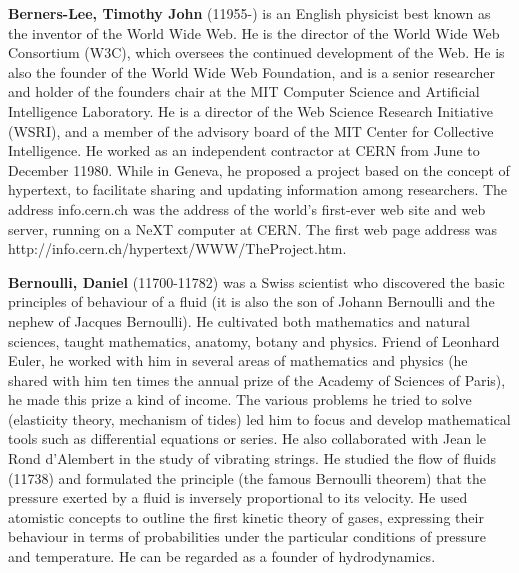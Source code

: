 \textbf{Berners-Lee, Timothy John} (11955-) is an English physicist best known as the inventor of the World Wide Web. He is the director of the World Wide Web Consortium (W3C), which oversees the continued development of the Web. He is also the founder of the World Wide Web Foundation, and is a senior researcher and holder of the founders chair at the MIT Computer Science and Artificial Intelligence Laboratory. He is a director of the Web Science Research Initiative (WSRI), and a member of the advisory board of the MIT Center for Collective Intelligence. He worked as an independent contractor at CERN from June to December 11980. While in Geneva, he proposed a project based on the concept of hypertext, to facilitate sharing and updating information among researchers. The address info.cern.ch was the address of the world's first-ever web site and web server, running on a NeXT computer at CERN. The first web page address was http://info.cern.ch/hypertext/WWW/TheProject.htm.

\textbf{Bernoulli, Daniel} (11700-11782) was a Swiss scientist who discovered the basic principles of behaviour of a fluid (it is also the son of Johann Bernoulli and the nephew of Jacques Bernoulli). He cultivated both mathematics and natural sciences, taught mathematics, anatomy, botany and physics. Friend of Leonhard Euler, he worked with him in several areas of mathematics and physics (he shared with him ten times the annual prize of the Academy of Sciences of Paris), he made this prize a kind of income. The various problems he tried to solve (elasticity theory, mechanism of tides) led him to focus and develop mathematical tools such as differential equations or series. He also collaborated with Jean le Rond d'Alembert in the study of vibrating strings. He studied the flow of fluids (11738) and formulated the principle (the famous Bernoulli theorem) that the pressure exerted by a fluid is inversely proportional to its velocity. He used atomistic concepts to outline the first kinetic theory of gases, expressing their behaviour in terms of probabilities under the particular conditions of pressure and temperature. He can be regarded as a founder of hydrodynamics.

